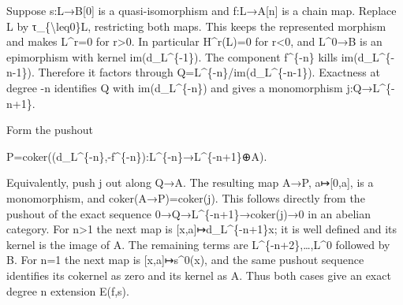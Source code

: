 Suppose s:\allowbreak{}L\allowbreak{}→B[0]\allowbreak{} is a quasi-isomorphism and f:\allowbreak{}L\allowbreak{}→A[n]\allowbreak{} is a chain map. Replace L by τ\_\allowbreak{}\{\textbackslash{}leq0\}L,\allowbreak{} restricting both maps. This keeps the represented morphism and makes L\textasciicircum{}r\allowbreak{}=0 for r\textgreater0. In particular H\textasciicircum{}r(L)\allowbreak{}\allowbreak{}=0 for r<0,\allowbreak{} and L\textasciicircum{}0\allowbreak{}→B is an epimorphism with kernel im(d\_\allowbreak{}L\textasciicircum{}\{-1\})\allowbreak{}. The component f\^{}\{-n\} kills im(d\_\allowbreak{}L\textasciicircum{}\{-n-1\})\allowbreak{}. Therefore it factors through Q\allowbreak{}=L\textasciicircum{}\{-n\}/\allowbreak{}im(d\_\allowbreak{}L\textasciicircum{}\{-n-1\})\allowbreak{}. Exactness at degree -n identifies Q with im(d\_\allowbreak{}L\textasciicircum{}\{-n\})\allowbreak{} and gives a monomorphism j:\allowbreak{}Q\allowbreak{}→L\textasciicircum{}\{-n\allowbreak{}+1\}.

Form the pushout

P\allowbreak{}=coker((d\_\allowbreak{}L\textasciicircum{}\{-n\},\allowbreak{}-f\textasciicircum{}\{-n\})\allowbreak{}:\allowbreak{}L\textasciicircum{}\{-n\}\allowbreak{}→L\textasciicircum{}\{-n\allowbreak{}+1\}\allowbreak{}⊕A)\allowbreak{}.

Equivalently,\allowbreak{} push j out along Q\allowbreak{}→A. The resulting map A\allowbreak{}→P,\allowbreak{} a\allowbreak{}↦[0,\allowbreak{}a]\allowbreak{},\allowbreak{} is a monomorphism,\allowbreak{} and coker(A\allowbreak{}→P)\allowbreak{}\allowbreak{}=coker(j)\allowbreak{}. This follows directly from the pushout of the exact sequence 0\allowbreak{}→Q\allowbreak{}→L\textasciicircum{}\{-n\allowbreak{}+1\}\allowbreak{}→coker(j)\allowbreak{}\allowbreak{}→0 in an abelian category. For n\textgreater1 the next map is [x,\allowbreak{}a]\allowbreak{}\allowbreak{}↦d\_\allowbreak{}L\textasciicircum{}\{-n\allowbreak{}+1\}x; it is well defined and its kernel is the image of A. The remaining terms are L\textasciicircum{}\{-n\allowbreak{}+2\},\allowbreak{}…,\allowbreak{}L\textasciicircum{}0 followed by B. For n\allowbreak{}=1 the next map is [x,\allowbreak{}a]\allowbreak{}\allowbreak{}↦s\textasciicircum{}0(x)\allowbreak{},\allowbreak{} and the same pushout sequence identifies its cokernel as zero and its kernel as A. Thus both cases give an exact degree n extension E(f,\allowbreak{}s)\allowbreak{}.

